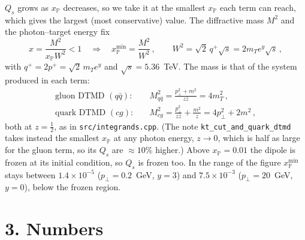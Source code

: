 \documentclass[12pt]{article}
\newcommand{\xpo}{x_{\mathbb{P}}}
\begin{document}
$Q_s$ grows as $\xpo$ decreases, so we take it at the smallest $\xpo$ each term can reach, which gives
the largest (most conservative) value. The diffractive mass $M^2$ and the photon--target energy fix
\begin{equation}
x=\frac{M^2}{\xpo W^2}<1\quad\Rightarrow\quad \xpo^{\min}=\frac{M^2}{W^2}\,,\qquad
W^2=\sqrt2\,q^+\sqrt{s}=2m_Te^{y}\sqrt{s}\,,
\end{equation}
with $q^+=2p^+=\sqrt2\,m_Te^y$ and $\sqrt{s}=5.36$~TeV. The mass is that of the system produced in each term:
\begin{align}
\text{gluon DTMD } (q\bar q):&\quad M_{q\bar q}^2=\frac{p_\perp^2+m^2}{z\bar z}=4m_T^2\,,\\
\text{quark DTMD } (cg):&\quad M_{cg}^2=\frac{p_\perp^2}{z\bar z}+\frac{m^2}{z}=4p_\perp^2+2m^2\,,
\end{align}
both at $z=\tfrac12$, as in \texttt{src/integrands.cpp}. (The note \texttt{kt\_cut\_and\_quark\_dtmd}
takes instead the smallest $\xpo$ at any photon energy, $z\to0$, which is half as large for the gluon term, so its $Q_s$ are
$\approx10\%$ higher.) Above $\xpo=0.01$ the dipole is frozen at its
initial condition, so $Q_s$ is frozen too. In the range of the figure $\xpo^{\min}$ stays between
$1.4\times10^{-5}$ ($p_\perp=0.2$~GeV, $y=3$) and $7.5\times10^{-3}$ ($p_\perp=20$~GeV, $y=0$), below the
frozen region.

\section*{3. Numbers}
\end{document}
